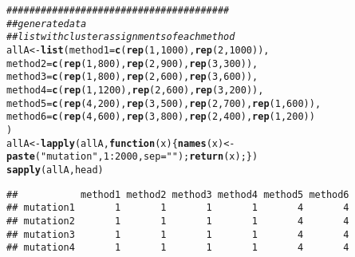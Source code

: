 \documentclass{article}\usepackage[]{graphicx}\usepackage[]{color}
\makeatletter
\newcommand{\hlnum}[1]{\textcolor[rgb]{0.686,0.059,0.569}{#1}}%
\newcommand{\hlstr}[1]{\textcolor[rgb]{0.192,0.494,0.8}{#1}}%
\newcommand{\hlcom}[1]{\textcolor[rgb]{0.678,0.584,0.686}{\textit{#1}}}%
\newcommand{\hlopt}[1]{\textcolor[rgb]{0,0,0}{#1}}%
\newcommand{\hlstd}[1]{\textcolor[rgb]{0.345,0.345,0.345}{#1}}%
\newcommand{\hlkwa}[1]{\textcolor[rgb]{0.161,0.373,0.58}{\textbf{#1}}}%
\newcommand{\hlkwb}[1]{\textcolor[rgb]{0.69,0.353,0.396}{#1}}%
\newcommand{\hlkwc}[1]{\textcolor[rgb]{0.333,0.667,0.333}{#1}}%
\newcommand{\hlkwd}[1]{\textcolor[rgb]{0.737,0.353,0.396}{\textbf{#1}}}%
\newenvironment{kframe}{%
 \def\at@end@of@kframe{}%
 \ifinner\ifhmode%
  \def\at@end@of@kframe{\end{minipage}}%
  \begin{minipage}{\columnwidth}%
 \fi\fi%
 \def\FrameCommand##1{\hskip\@totalleftmargin \hskip-\fboxsep
 \colorbox{shadecolor}{##1}\hskip-\fboxsep
     \hskip-\linewidth \hskip-\@totalleftmargin \hskip\columnwidth}%
 \MakeFramed {\advance\hsize-\width
   \@totalleftmargin\z@ \linewidth\hsize
   \@setminipage}}%
 {\par\unskip\endMakeFramed%
 \at@end@of@kframe}
\newenvironment{knitrout}{}{} %
\makeatother
\begin{document}
\begin{knitrout}\scriptsize
{}\color{fgcolor}\begin{kframe}
\begin{alltt}
\hlcom{## #####################################}
\hlcom{## generate data}
\hlcom{## list with cluster assignments of each method}
\hlstd{allA} \hlkwb{<-} \hlkwd{list}\hlstd{(}\hlkwc{method1}\hlstd{=}\hlkwd{c}\hlstd{(}\hlkwd{rep}\hlstd{(}\hlnum{1}\hlstd{,}\hlnum{1000}\hlstd{),}\hlkwd{rep}\hlstd{(}\hlnum{2}\hlstd{,}\hlnum{1000}\hlstd{)),}
             \hlkwc{method2}\hlstd{=}\hlkwd{c}\hlstd{(}\hlkwd{rep}\hlstd{(}\hlnum{1}\hlstd{,}\hlnum{800}\hlstd{),}\hlkwd{rep}\hlstd{(}\hlnum{2}\hlstd{,}\hlnum{900}\hlstd{),} \hlkwd{rep}\hlstd{(}\hlnum{3}\hlstd{,}\hlnum{300}\hlstd{)),}
             \hlkwc{method3}\hlstd{=}\hlkwd{c}\hlstd{(}\hlkwd{rep}\hlstd{(}\hlnum{1}\hlstd{,}\hlnum{800}\hlstd{),}\hlkwd{rep}\hlstd{(}\hlnum{2}\hlstd{,}\hlnum{600}\hlstd{),} \hlkwd{rep}\hlstd{(}\hlnum{3}\hlstd{,}\hlnum{600}\hlstd{)),}
             \hlkwc{method4}\hlstd{=}\hlkwd{c}\hlstd{(}\hlkwd{rep}\hlstd{(}\hlnum{1}\hlstd{,}\hlnum{1200}\hlstd{),}\hlkwd{rep}\hlstd{(}\hlnum{2}\hlstd{,}\hlnum{600}\hlstd{),} \hlkwd{rep}\hlstd{(}\hlnum{3}\hlstd{,}\hlnum{200}\hlstd{)),}
             \hlkwc{method5}\hlstd{=}\hlkwd{c}\hlstd{(}\hlkwd{rep}\hlstd{(}\hlnum{4}\hlstd{,}\hlnum{200}\hlstd{),}\hlkwd{rep}\hlstd{(}\hlnum{3}\hlstd{,}\hlnum{500}\hlstd{),} \hlkwd{rep}\hlstd{(}\hlnum{2}\hlstd{,}\hlnum{700}\hlstd{),}\hlkwd{rep}\hlstd{(}\hlnum{1}\hlstd{,}\hlnum{600}\hlstd{)),}
             \hlkwc{method6}\hlstd{=}\hlkwd{c}\hlstd{(}\hlkwd{rep}\hlstd{(}\hlnum{4}\hlstd{,}\hlnum{600}\hlstd{),}\hlkwd{rep}\hlstd{(}\hlnum{3}\hlstd{,}\hlnum{800}\hlstd{),} \hlkwd{rep}\hlstd{(}\hlnum{2}\hlstd{,}\hlnum{400}\hlstd{),}\hlkwd{rep}\hlstd{(}\hlnum{1}\hlstd{,}\hlnum{200}\hlstd{))}
             \hlstd{)}
\hlstd{allA} \hlkwb{<-} \hlkwd{lapply}\hlstd{(allA,}\hlkwa{function}\hlstd{(}\hlkwc{x}\hlstd{) \{}\hlkwd{names}\hlstd{(x)} \hlkwb{<-} \hlkwd{paste}\hlstd{(}\hlstr{"mutation"}\hlstd{,}\hlnum{1}\hlopt{:}\hlnum{2000}\hlstd{,}\hlkwc{sep}\hlstd{=}\hlstr{""}\hlstd{);}\hlkwd{return}\hlstd{(x);\})}
\hlkwd{sapply}\hlstd{(allA,head)}
\end{alltt}
\begin{verbatim}
##           method1 method2 method3 method4 method5 method6
## mutation1       1       1       1       1       4       4
## mutation2       1       1       1       1       4       4
## mutation3       1       1       1       1       4       4
## mutation4       1       1       1       1       4       4

\end{verbatim}
\end{kframe}
\end{knitrout}
\end{document}
